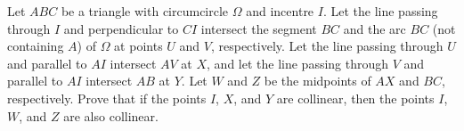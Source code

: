 Let $ABC$ be a triangle with circumcircle $\Omega$ and incentre $I$. Let the line passing through $I$ and perpendicular to $CI$ intersect the segment $BC$ and the arc $BC$ (not containing $A$) of $\Omega$ at points $U$ and $V$, respectively. Let the line passing through $U$ and parallel to $AI$ intersect $AV$ at $X$, and let the line passing through $V$ and parallel to $AI$ intersect $AB$ at $Y$. Let $W$ and $Z$ be the midpoints of $AX$ and $BC$, respectively. Prove that if the points $I$, $X$, and $Y$ are collinear, then the points $I$, $W$, and $Z$ are also collinear.
